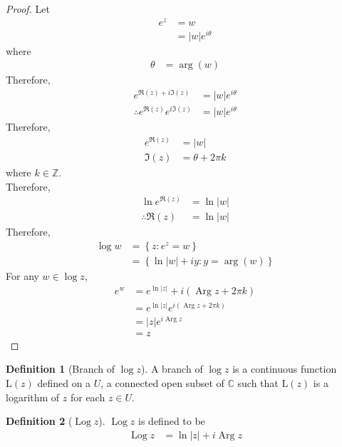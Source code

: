 \documentclass[titlepage, fleqn, a4paper, 12pt, twoside]{article}
\theoremstyle{definition}
\newtheorem{definition}{Definition}
\theoremstyle{theorem}
\DeclareMathOperator{\Arg}{Arg}
\DeclareMathOperator{\Log}{Log}
\begin{document}
\begin{proof}
	Let
	\begin{align*}
		e^z &= w\\
		&= |w| e^{i \theta}
	\end{align*}
	where
	\begin{align*}
		\theta &= \arg(w)
	\end{align*}
	Therefore,
	\begin{align*}
		e^{\Re(z) + i \Im(z)} &= |w| e^{i \theta}\\
		\therefore e^{\Re(z)} e^{i \Im(z)} &= |w| e^{i \theta}
	\end{align*}
	Therefore,
	\begin{align*}
		e^{\Re(z)} &= |w|\\
		\Im(z) &= \theta + 2 \pi k
	\end{align*}
	where $k \in \mathbb{Z}$.\\
	Therefore,
	\begin{align*}
		\ln e^{\Re(z)} &= \ln |w|\\
		\therefore \Re(z) &= \ln |w|
	\end{align*}
	Therefore,
	\begin{align*}
		\log w &= \left\{ z : e^z = w \right\}\\
		&= \left\{ \ln |w| + i y : y = \arg(w) \right\}
	\end{align*}
	For any $w \in \log z$,
	\begin{align*}
		e^w &= e^{\ln |z|} + i \left( \Arg z + 2 \pi k \right)\\
		&= e^{\ln |z|} e^{i \left( \Arg z + 2 \pi k \right)}\\
		&= |z| e^{i \Arg z}\\
		&= z
	\end{align*}
\end{proof}

\begin{definition}[Branch of $\log z$]
	A branch of $\log z$ is a continuous function $\mathrm{L}(z)$ defined on a $U$, a connected open subset of $\mathbb{C}$ such that $\mathrm{L}(z)$ is a logarithm of $z$ for each $z \in U$.
\end{definition}

\begin{definition}[$\Log z$]
	$\Log z$ is defined to be
	\begin{align*}
		\Log z &= \ln |z| + i \Arg z
	\end{align*}
\end{definition}
\end{document}
